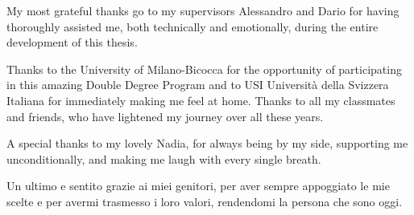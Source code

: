 
My most grateful thanks go to my supervisors Alessandro and Dario for having thoroughly assisted me, both technically and emotionally, during the entire development of this thesis.

\smallskip

Thanks to the University of Milano-Bicocca for the opportunity of participating in this amazing Double Degree Program and to USI Università della Svizzera Italiana for immediately making me feel at home. Thanks to all my classmates and friends, who have lightened my journey over all these years.

\bigskip

A special thanks to my lovely Nadia, for always being by my side, supporting me unconditionally, and making me laugh with every single breath.

\smallskip

Un ultimo e sentito grazie ai miei genitori, per aver sempre appoggiato le mie scelte e per avermi trasmesso i loro valori, rendendomi la persona che sono oggi.